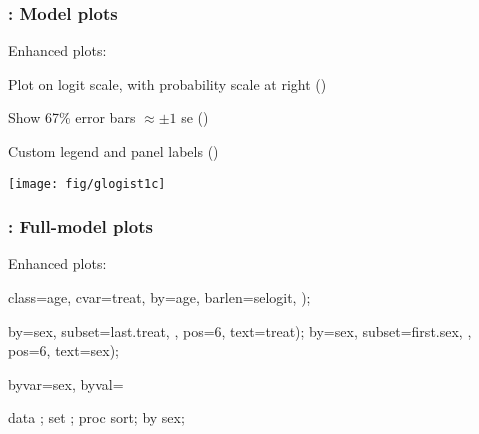 \begin{frame}
  \frametitle{: Model plots}
Enhanced plots:

  \begin{itemize*}
	\item Plot on logit scale, with probability scale at right ()
	\item Show 67\% error bars $\approx \pm 1$ se ()
	\item Custom legend and panel labels ()
  \end{itemize*}

 \begin{center}
  \texttt{[image: fig/glogist1c]}
 \end{center}

\end{frame}

\begin{frame}[fragile]
  \frametitle{: Full-model plots}
Enhanced plots:

\begin{Input}[fontsize=\footnotesize,label=\fbox{$\cdots$ \texttt{glogist1c.sas} $\cdots$},baselinestretch=0.7,firstnumber=9]
   class=age, cvar=treat, by=age,
   barlen=selogit, );

   by=sex, subset=last.treat, , pos=6, text=treat);
   by=sex, subset=first.sex, , pos=6, text=sex);

   byvar=sex, byval=%

data ;
   set ;
proc sort;
   by sex;
\end{Input}
\end{frame}

